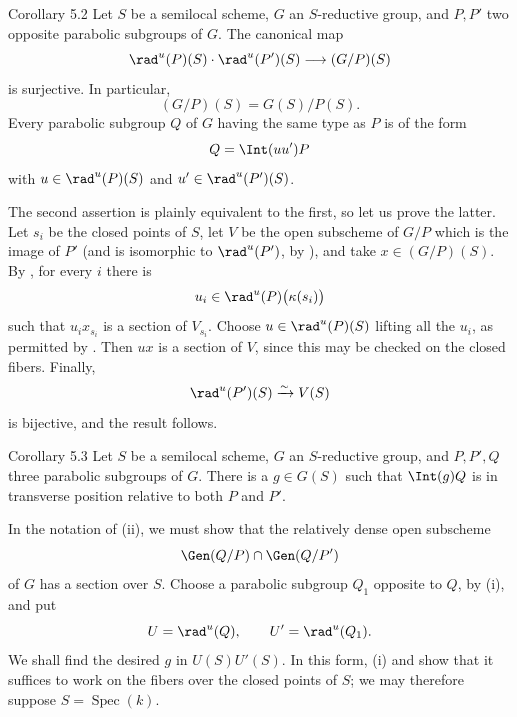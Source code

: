 \begin{sgastatement}{Corollary 5.2}
Let \(S\) be a semilocal scheme, \(G\) an \(S\)-reductive group, and
\(P,P'\) two opposite parabolic subgroups of \(G\).  The canonical map
\[
 \rad^u(P)(S)\cdot\rad^u(P')(S)\longrightarrow(G/P)(S)
\]
is surjective.  In particular,
\[
 (G/P)(S)=G(S)/P(S).
\]
Every parabolic subgroup \(Q\) of \(G\) having the same type as \(P\)
is of the form
\[
 Q=\Int(uu')P
\]
with \(u\in\rad^u(P)(S)\) and \(u'\in\rad^u(P')(S)\).
\end{sgastatement}

The second assertion is plainly equivalent to the first, so let us
prove the latter.  Let \(s_i\) be the closed points of \(S\), let
\(V\) be the open subscheme of \(G/P\) which is the image of \(P'\)
\textup{(and is isomorphic to \(\rad^u(P')\), by )}, and take
\(x\in(G/P)(S)\).  By , for every \(i\) there is
\[
 u_i\in\rad^u(P)\bigl(\kappa(s_i)\bigr)
\]
such that \(u_ix_{s_i}\) is a section of \(V_{s_i}\).  Choose
\(u\in\rad^u(P)(S)\) lifting all the \(u_i\), as permitted by .
Then \(ux\) is a section of \(V\), since this may be checked on the
closed fibers.  Finally,
\[
 \rad^u(P')(S)\xrightarrow{\sim}V(S)
\]
is bijective, and the result follows.

\begin{sgastatement}{Corollary 5.3}
Let \(S\) be a semilocal scheme, \(G\) an \(S\)-reductive group, and
\(P,P',Q\) three parabolic subgroups of \(G\).  There is a
\(g\in G(S)\) such that \(\Int(g)Q\) is in transverse position
relative to both \(P\) and \(P'\).
\end{sgastatement}

In the notation of \textup{(ii)}, we must show that the
relatively dense open subscheme
\[
 \Gen(Q/P)\cap\Gen(Q/P')
\]
of \(G\) has a section over \(S\).
Choose a parabolic subgroup \(Q_1\) opposite to \(Q\), by
\textup{(i)}, and put
\[
 U=\rad^u(Q),\qquad U'=\rad^u(Q_1).
\]
We shall find the desired \(g\) in \(U(S)U'(S)\).  In this form,
\textup{(i)} and  show that it suffices to work on the fibers
over the closed points of \(S\); we may therefore suppose
\(S=\operatorname{Spec}(k)\).

